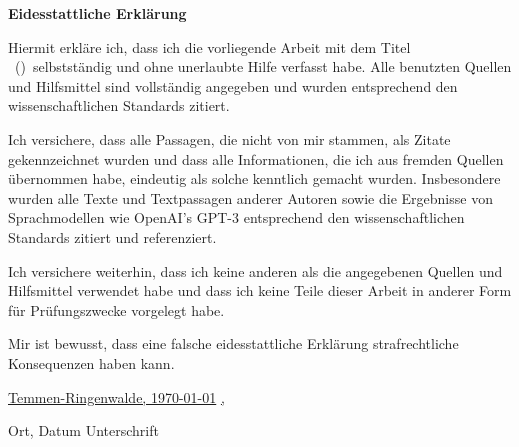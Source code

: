 \textbf{Eidesstattliche Erklärung}\vspace{0.3cm}

Hiermit erkläre ich, dass ich die vorliegende Arbeit mit dem Titel \glqq \bookTitle\ (\textit{\bookSubTitle})\grqq\ selbstständig und ohne unerlaubte Hilfe verfasst habe. Alle benutzten Quellen und Hilfsmittel sind vollständig angegeben und wurden entsprechend den wissenschaftlichen Standards zitiert.\vspace{0.3cm}

Ich versichere, dass alle Passagen, die nicht von mir stammen, als Zitate gekennzeichnet wurden und dass alle Informationen, die ich aus fremden Quellen übernommen habe, eindeutig als solche kenntlich gemacht wurden. Insbesondere wurden alle Texte und Textpassagen anderer Autoren sowie die Ergebnisse von Sprachmodellen wie OpenAI's GPT-3 entsprechend den wissenschaftlichen Standards zitiert und referenziert.\vspace{0.3cm}

Ich versichere weiterhin, dass ich keine anderen als die angegebenen Quellen und Hilfsmittel verwendet habe und dass ich keine Teile dieser Arbeit in anderer Form für Prüfungszwecke vorgelegt habe.\vspace{0.3cm}

Mir ist bewusst, dass eine falsche eidesstattliche Erklärung strafrechtliche Konsequenzen haben kann.\vspace{2.0cm}

\underline{Temmen-Ringenwalde, \today} \hspace{1cm} \underline{, \hspace{6cm}}

\hspace{0.2cm} Ort, Datum \hspace{5.5cm} Unterschrift






